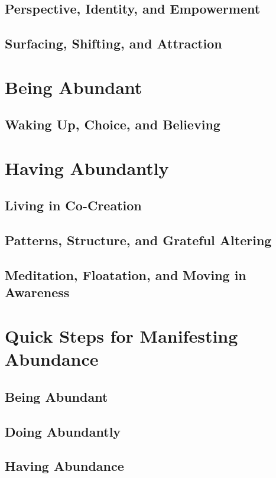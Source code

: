 \documentclass[12pt]{report}
\begin{document}
\section{Perspective, Identity, and Empowerment}

\section{Surfacing, Shifting, and Attraction}


\chapter{Being Abundant}


\section{Waking Up, Choice, and Believing}

\chapter{Having Abundantly}

\section{Living in Co-Creation}

\section{Patterns, Structure, and Grateful Altering}

\section{Meditation, Floatation, and Moving in Awareness}

\chapter{Quick Steps for Manifesting Abundance}

\section{Being Abundant}

\section{Doing Abundantly}

\section{Having Abundance}



\printindex
\end{document}
